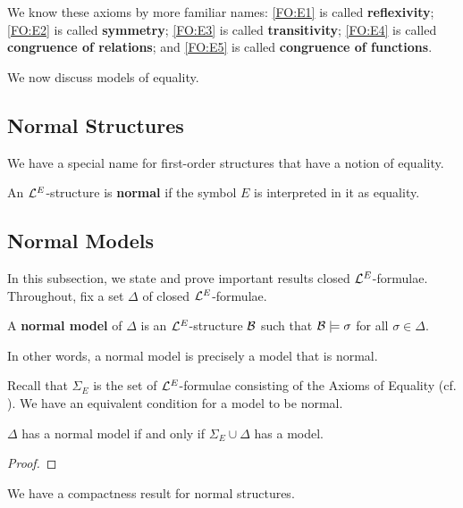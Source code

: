 We know these axioms by more familiar names: \ref{FO:E1} is called \textbf{reflexivity}; \ref{FO:E2} is called \textbf{symmetry}; \ref{FO:E3} is called \textbf{transitivity}; \ref{FO:E4} is called \textbf{congruence of relations}; and \ref{FO:E5} is called \textbf{congruence of functions}.

We now discuss models of equality.

\subsection{Normal Structures}

We have a special name for first-order structures that have a notion of equality.

\begin{boxdefinition}
    An $\mathcal{L}^{E}$-structure is \textbf{normal} if the symbol $E$ is interpreted in it as equality.
\end{boxdefinition}

\sorry %

\subsection{Normal Models}

In this subsection, we state and prove important results closed $\mathcal{L}^{E}$-formulae. Throughout, fix a set $\Delta$ of closed $\mathcal{L}^{E}$-formulae.

\begin{boxdefinition}
    A \textbf{normal model} of $\Delta$ is an $\mathcal{L}^{E}$-structure $\mathcal{B}$ such that $\mathcal{B} \models \sigma$ for all $\sigma \in \Delta$.
\end{boxdefinition}
In other words, a normal model is precisely a model that is normal.

Recall that $\Sigma_E$ is the set of $\mathcal{L}^{E}$-formulae consisting of the Axioms of Equality (cf. ). We have an equivalent condition for a model to be normal.

\begin{boxlemma}\label{Ch2:Lemma:Equiv_Def_Normal_Model}
    $\Delta$ has a normal model if and only if $\Sigma_E \cup \Delta$ has a model.
\end{boxlemma}
\begin{proof}
    \sorry
\end{proof}

We have a compactness result for normal structures.

